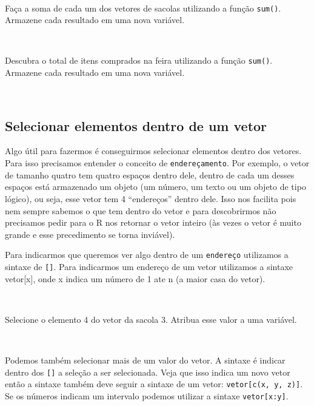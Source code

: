 \documentclass[]{book}
\theoremstyle{definition}
\theoremstyle{definition}
\theoremstyle{definition}
\theoremstyle{remark}
\let\BeginKnitrBlock\begin \let\EndKnitrBlock\end
\begin{document}
~
\BeginKnitrBlock{exercise}
\protect\hypertarget{exr:unnamed-chunk-31}{}{\label{exr:unnamed-chunk-31} }Faça a soma de cada um dos vetores de sacolas utilizando a função \texttt{sum()}. Armazene cada resultado em uma nova variável.
\EndKnitrBlock{exercise}

~

\BeginKnitrBlock{exercise}
\protect\hypertarget{exr:unnamed-chunk-32}{}{\label{exr:unnamed-chunk-32} }Descubra o total de itens comprados na feira utilizando a função \texttt{sum()}. Armazene cada resultado em uma nova variável.
\EndKnitrBlock{exercise}

~

\hypertarget{selecionar-elementos-dentro-de-um-vetor}{%
\subsection{Selecionar elementos dentro de um vetor}\label{selecionar-elementos-dentro-de-um-vetor}}

Algo útil para fazermos é conseguirmos selecionar elementos dentro dos vetores. Para isso precisamos entender o conceito de \texttt{endereçamento}. Por exemplo, o vetor de tamanho quatro tem quatro espaços dentro dele, dentro de cada um desses espaços está armazenado um objeto (um número, um texto ou um objeto de tipo lógico), ou seja, esse vetor tem 4 ``endereços'' dentro dele. Isso nos facilita pois nem sempre sabemos o que tem dentro do vetor e para descobrirmos não precisamos pedir para o R nos retornar o vetor inteiro (às vezes o vetor é muito grande e esse precedimento se torna inviável).

Para indicarmos que queremos ver algo dentro de um \texttt{endereço} utilizamos a sintaxe de \texttt{{[}{]}}. Para indicarmos um endereço de um vetor utilizamos a sintaxe vetor{[}x{]}, onde x indica um número de 1 ate n (a maior casa do vetor).

~

\BeginKnitrBlock{exercise}
\protect\hypertarget{exr:unnamed-chunk-33}{}{\label{exr:unnamed-chunk-33} }Selecione o elemento 4 do vetor da sacola 3. Atribua esse valor a uma variável.
\EndKnitrBlock{exercise}

~

Podemos também selecionar mais de um valor do vetor. A sintaxe é indicar dentro dos \texttt{{[}{]}} a seleção a ser selecionada. Veja que isso indica um novo vetor então a sintaxe também deve seguir a sintaxe de um vetor: \texttt{vetor{[}c(x,\ y,\ z){]}}. Se os números indicam um intervalo podemos utilizar a sintaxe \texttt{vetor{[}x:y{]}}.
\end{document}
